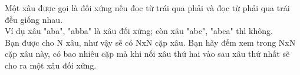 Một xâu được gọi là đối xứng nếu đọc từ trái qua phải và đọc từ phải qua trái đều giống nhau.   
\\   Ví dụ xâu "aba", "abba" là xâu đối xứng; còn xâu "abc", "abca" thì không.   
\\   Bạn được cho N xâu, như vậy sẽ có NxN cặp xâu. Bạn hãy đếm xem trong NxN cặp xâu này, có bao nhiêu cặp mà khi nối xâu thứ hai vào sau xâu thứ nhất sẽ cho ra một xâu đối xứng.
